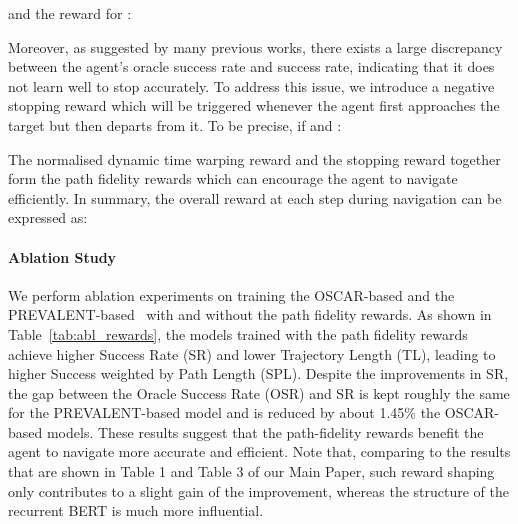 \documentclass[final]{cvpr}
\begin{document}
and the reward for :


Moreover, as suggested by many previous works, there exists a large discrepancy between the agent's oracle success rate and success rate, indicating that it does not learn well to stop accurately. To address this issue, we introduce a negative stopping reward  which will be triggered whenever the agent first approaches the target but then departs from it. To be precise, if  and :


The normalised dynamic time warping reward  and the stopping reward  together form the path fidelity rewards which can encourage the agent to navigate efficiently.
In summary, the overall reward at each step during navigation can be expressed as:


\paragraph{Ablation Study}

We perform ablation experiments on training the OSCAR-based and the PREVALENT-based \vlnbert~with and without the path fidelity rewards. As shown in Table~\ref{tab:abl_rewards}, the models trained with the path fidelity rewards achieve higher Success Rate (SR) and lower Trajectory Length (TL), leading to higher Success weighted by Path Length (SPL). Despite the improvements in SR, the gap between the Oracle Success Rate (OSR) and SR is kept roughly the same for the PREVALENT-based model and is reduced by about 1.45\% the OSCAR-based models. These results suggest that the path-fidelity rewards benefit the agent to navigate more accurate and efficient. Note that, comparing to the results that are shown in Table 1 and Table 3 of our Main Paper, such reward shaping only contributes to a slight gain of the improvement, whereas the structure of the recurrent BERT is much more influential.
\end{document}
